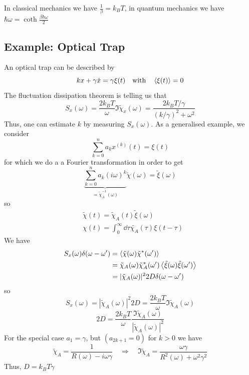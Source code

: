 \documentclass{notebook}
\begin{document}
In classical mechanics we have $\frac{1}{\beta} = k_B T$, in quantum mechanics we have $\hbar \omega = \coth \frac{\beta \hbar \omega}{2}$

\subsection*{Example: Optical Trap}

An optical trap can be described by 
%
\begin{equation}
	k x + \gamma \dot{x} = \gamma \xi(t) \quad \mathrm{with} \quad \expval{\xi(t)} = 0
\end{equation}
%
The fluctuation dissipation theorem is telling us that
%
\begin{equation}
	S_x(\omega) = \frac{2 k_B T}{\omega} \Im \tilde{\chi}_x(\omega) = \frac{2 k_B T / \gamma}{(k/\gamma)^2 + \omega^2}
\end{equation}
%
Thus, one can  estimate $k$ by measuring $S_x(\omega)$. As a generalised example, we consider
%
\begin{equation}
	\sum_{k = 0}^n a_k x^{(k)}(t) = \xi(t)
\end{equation}
%
for which we do a a Fourier transformation in order to get
%
\begin{equation}
	\underbrace{\sum_{k = 0}^n a_k (i \omega)^k}_{= \tilde{\chi}^{-1}_A(\omega)} \tilde{\chi}(\omega) = \tilde{\xi}(\omega)
\end{equation}
%
so
%
\begin{align*}
	& \tilde{\chi}(t) = \tilde{\chi}_A(t) \tilde{\xi}(\omega) \\
	& \chi(t) = \int_0^{\infty} \dd{\tau} \tilde{\chi_A}(\tau) \xi(t-\tau)
\end{align*}
%
We have
%
\begin{align*}
S_x(\omega) \delta(\omega - \omega') &= \expval{\tilde{\chi}(\omega)\tilde{\chi}^*(\omega')} \\ 
&= \tilde{\chi}_A(\omega) \tilde{\chi}^*_A(\omega') \expval{\tilde{\xi}(\omega) \tilde{\xi}(\omega')} \\
&= |\tilde{\chi}_A(\omega)|^2 2D \delta(\omega - \omega')
\end{align*}
%
so 
%
\begin{equation}
	S_x(\omega) = |\tilde{\chi}_A(\omega)|^2 2D = \frac{2 k_B T}{\omega} \Im \tilde{\chi}_A(\omega)
\end{equation}
%
%
\begin{equation}
	2D = \frac{2 k_B T}{\omega} \frac{\Im \tilde{\chi}_A(\omega)}{|\tilde{\chi}_A(\omega)|^2}
\end{equation}
%
For the special case $a_1 = \gamma$, but $(a_{2k+1} = 0)$ for $k > 0$ we have
%
\begin{equation}
	\tilde{\chi}_A = \frac{1}{R(\omega) - i \omega \gamma} \quad \Rightarrow \quad \Im \tilde{\chi}_A = \frac{\omega \gamma}{R^2(\omega) + \omega^2 \gamma^2}
\end{equation}
%
Thus, $D = k_B T \gamma$
\end{document}
